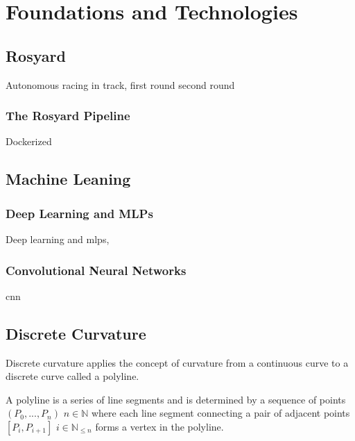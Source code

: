 

\graphicspath{{Chapter/Figs/FoundationsAndTechnologies/}}
\chapter{Foundations and Technologies}

\section{Rosyard}
Autonomous racing in track, first round second round

\subsection{The Rosyard Pipeline}
Dockerized

\section{Machine Leaning}
\subsection{Deep Learning and MLPs}
Deep learning and \ac{mlp}s,
\subsection{Convolutional Neural Networks}
\ac{cnn}

%

\section{Discrete Curvature}
Discrete curvature applies the concept of curvature from a continuous curve to a discrete curve called a polyline.

\vskip 0.2in


A polyline is a series of line segments and is determined by a sequence of points $(P_0,...,P_n)$ $n \in \mathbb{N}$ where each line segment connecting a pair of adjacent points $[P_i,P_{i+1}]$ $i \in \mathbb{N}_{\le n}$ forms a vertex in the polyline.

